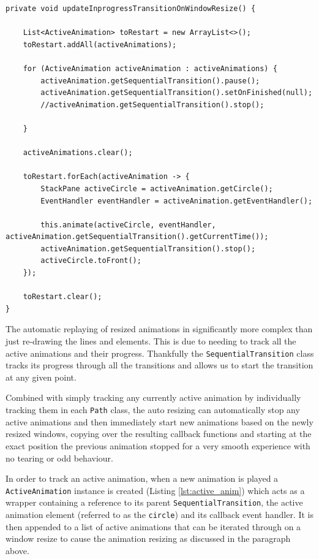 \begin{lstlisting}[caption=Function to update inprogress animations on a window resize, label=lst:resize_anim]
private void updateInprogressTransitionOnWindowResize() {

    List<ActiveAnimation> toRestart = new ArrayList<>();
    toRestart.addAll(activeAnimations);

    for (ActiveAnimation activeAnimation : activeAnimations) {
        activeAnimation.getSequentialTransition().pause();
        activeAnimation.getSequentialTransition().setOnFinished(null);
        //activeAnimation.getSequentialTransition().stop();

    }

    activeAnimations.clear();

    toRestart.forEach(activeAnimation -> {
        StackPane activeCircle = activeAnimation.getCircle();
        EventHandler eventHandler = activeAnimation.getEventHandler();

        this.animate(activeCircle, eventHandler, activeAnimation.getSequentialTransition().getCurrentTime());
        activeAnimation.getSequentialTransition().stop();
        activeCircle.toFront();
    });

    toRestart.clear();
}
\end{lstlisting}

The automatic replaying of resized animations in significantly more complex than just re-drawing the lines and elements. This is due to needing to track all the active animations and their progress. Thankfully the \texttt{SequentialTransition} class tracks its progress through all the transitions and allows us to start the transition at any given point. 

Combined with simply tracking any currently active animation by individually tracking them in each \texttt{Path} class, the auto resizing can automatically stop any active animations and then immediately start new animations based on the newly resized windows, copying over the resulting callback functions and starting at the exact position the previous animation stopped for a very smooth experience with no tearing or odd behaviour.

In order to track an active animation, when a new animation is played a \texttt{ActiveAnimation} instance is created (Listing \ref{lst:active_anim}) which acts as a wrapper containing a reference to its parent \texttt{SequentialTransition}, the active animation element (referred to as the \texttt{circle}) and its callback event handler. It is then appended to a list of active animations that can be iterated through on a window resize to cause the animation resizing as discussed in the paragraph above.

